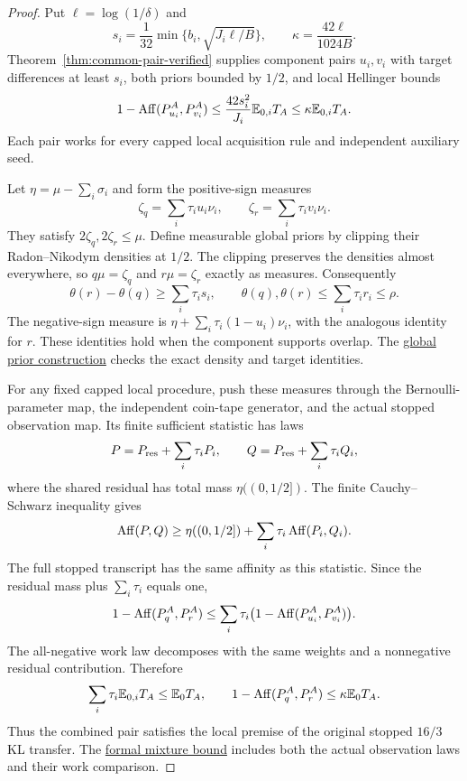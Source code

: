 \begin{proof}
Put $\ell=\log(1/\delta)$ and
\[
 s_i=\frac1{32}\min\{b_i,\sqrt{J_i\ell/B}\},
 \qquad \kappa=\frac{42\ell}{1024B}.
\]
Theorem~\ref{thm:common-pair-verified} supplies component pairs
$u_i,v_i$ with target differences at least $s_i$, both priors
bounded by $1/2$, and local Hellinger bounds
\[
 1-\operatorname{Aff}(P_{u_i}^A,P_{v_i}^A)
 \le \frac{42s_i^2}{J_i}\mathbb E_{0,i}T_A
 \le \kappa\mathbb E_{0,i}T_A.
\]
Each pair works for every capped local acquisition rule and
independent auxiliary seed.

Let $\eta=\mu-\sum_i\sigma_i$ and form the positive-sign measures
\[
 \zeta_q=\sum_i\tau_i u_i\nu_i,\qquad
 \zeta_r=\sum_i\tau_i v_i\nu_i.
\]
They satisfy $2\zeta_q,2\zeta_r\le\mu$. Define measurable global
priors by clipping their Radon--Nikodym densities at $1/2$.
The clipping preserves the densities almost everywhere, so
$q\mu=\zeta_q$ and $r\mu=\zeta_r$ exactly as measures.
Consequently
\[
 \theta(r)-\theta(q)\ge\sum_i\tau_i s_i,\qquad
 \theta(q),\theta(r)\le\sum_i\tau_i r_i\le\rho.
\]
The negative-sign measure is
$\eta+\sum_i\tau_i(1-u_i)\nu_i$, with the analogous identity
for $r$. These identities hold when the component supports overlap.
The
\href{https://github.com/davidiach/adaptive-threshold-estimation/blob/b64f44f43aa0bb2c43f83ad428a4bc9627a5f773/lean/ThresholdHC/AdditiveConfidence/PositiveMass.lean}{global prior construction}
checks the exact density and target identities.

\clearpage
For any fixed capped local procedure, push these measures through
the Bernoulli-parameter map, the independent coin-tape generator,
and the actual stopped observation map. Its finite sufficient
statistic has laws
\[
 P=P_{\rm res}+\sum_i\tau_i P_i,\qquad
 Q=P_{\rm res}+\sum_i\tau_i Q_i,
\]
where the shared residual has total mass $\eta((0,1/2])$.
The finite Cauchy--Schwarz inequality gives
\[
 \operatorname{Aff}(P,Q)\ge
 \eta((0,1/2])+\sum_i\tau_i\operatorname{Aff}(P_i,Q_i).
\]
The full stopped transcript has the same affinity as this statistic.
Since the residual mass plus $\sum_i\tau_i$ equals one,
\[
 1-\operatorname{Aff}(P_q^A,P_r^A)
 \le\sum_i\tau_i\bigl(1-\operatorname{Aff}(P_{u_i}^A,P_{v_i}^A)\bigr).
\]
The all-negative work law decomposes with the same weights and a
nonnegative residual contribution. Therefore
\[
 \sum_i\tau_i\mathbb E_{0,i}T_A\le\mathbb E_0T_A,
 \qquad
 1-\operatorname{Aff}(P_q^A,P_r^A)\le\kappa\mathbb E_0T_A.
\]
Thus the combined pair satisfies the local premise of the original
stopped $16/3$ KL transfer. The
\href{https://github.com/davidiach/adaptive-threshold-estimation/blob/b64f44f43aa0bb2c43f83ad428a4bc9627a5f773/lean/ThresholdHC/AdditiveConfidence/LocalBound.lean}{formal mixture bound}
includes both the actual observation laws and their work comparison.


\end{proof}
